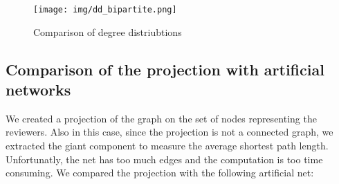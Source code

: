 \documentclass[sigchi]{acmart}
\begin{document}
\begin{figure}[h]
  \centering
  \texttt{[image: img/dd\_bipartite.png]}
  \caption{Comparison of degree distriubtions}
  \label{dd_comp}
\end{figure}

\subsection{Comparison of the projection with artificial networks}
We created a projection of the graph on the set of nodes representing the reviewers. Also in this case, since the projection is not a connected graph, we extracted the giant component to measure the average shortest path length. Unfortunatly, the net has too much edges and the computation is too time consuming. We compared the projection with the following artificial net: 
\end{document}
